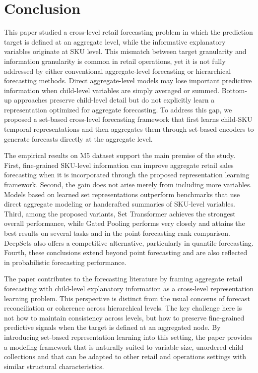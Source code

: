 \documentclass[12pt]{article}
\begin{document}
\section{Conclusion}
\label{sec:conclusion}

This paper studied a cross-level retail forecasting problem in which the prediction target is defined at an aggregate level, while the informative explanatory variables originate at SKU level. This mismatch between target granularity and information granularity is common in retail operations, yet it is not fully addressed by either conventional aggregate-level forecasting or hierarchical forecasting methods. Direct aggregate-level models may lose important predictive information when child-level variables are simply averaged or summed. Bottom-up approaches preserve child-level detail but do not explicitly learn a representation optimized for aggregate forecasting. To address this gap, we proposed a set-based cross-level forecasting framework that first learns child-SKU temporal representations and then aggregates them through set-based encoders to generate forecasts directly at the aggregate level.

The empirical results on M5 dataset support the main premise of the study. First, fine-grained SKU-level information can improve aggregate retail sales forecasting when it is incorporated through the proposed representation learning framework. Second, the gain does not arise merely from including more variables. Models based on learned set representations outperform benchmarks that use direct aggregate modeling or handcrafted summaries of SKU-level variables. Third, among the proposed variants, Set Transformer achieves the strongest overall performance, while Gated Pooling performs very closely and attains the best results on several tasks and in the point forecasting rank comparison. DeepSets also offers a competitive alternative, particularly in quantile forecasting. Fourth, these conclusions extend beyond point forecasting and are also reflected in probabilistic forecasting performance.

The paper contributes to the forecasting literature by framing aggregate retail forecasting with child-level explanatory information as a cross-level representation learning problem. This perspective is distinct from the usual concerns of forecast reconciliation or coherence across hierarchical levels. The key challenge here is not how to maintain consistency across levels, but how to preserve fine-grained predictive signals when the target is defined at an aggregated node. By introducing set-based representation learning into this setting, the paper provides a modeling framework that is naturally suited to variable-size, unordered child collections and that can be adapted to other retail and operations settings with similar structural characteristics.
\end{document}
